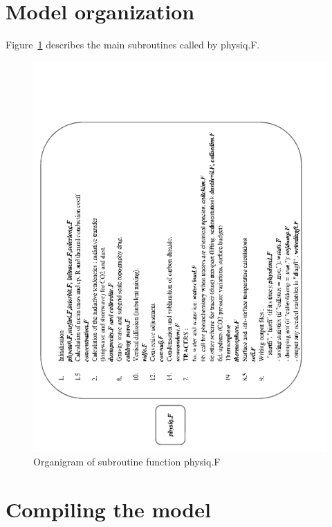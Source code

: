 \section{Model organization}
Figure~\ref{fg:organi_phys} describes the main subroutines called by physiq.F. 
\begin{figure}
\begin{flushleft}
\includegraphics[scale=0.70,angle=-90]{Fig/physique.pdf}
\caption{Organigram of subroutine function physiq.F}
\label{fg:organi_phys}
\end{flushleft}
\end{figure}



\section{Compiling the model}

